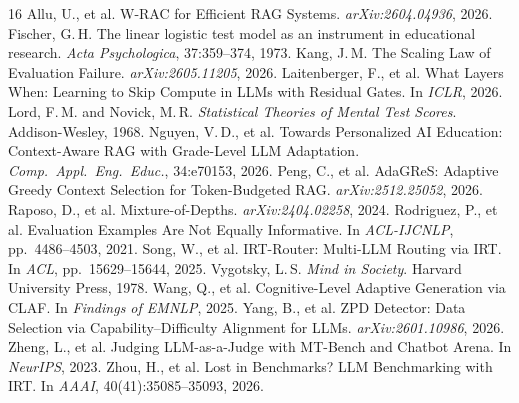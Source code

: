 \documentclass[11pt]{article}
\begin{document}

\begin{thebibliography}{16}
 Allu, U., et al. W-RAC for Efficient RAG Systems. \emph{arXiv:2604.04936}, 2026.
 Fischer, G.\,H. The linear logistic test model as an instrument in educational research. \emph{Acta Psychologica}, 37:359--374, 1973.
 Kang, J.\,M. The Scaling Law of Evaluation Failure. \emph{arXiv:2605.11205}, 2026.
 Laitenberger, F., et al. What Layers When: Learning to Skip Compute in LLMs with Residual Gates. In \emph{ICLR}, 2026.
 Lord, F.\,M. and Novick, M.\,R. \emph{Statistical Theories of Mental Test Scores}. Addison-Wesley, 1968.
 Nguyen, V.\,D., et al. Towards Personalized AI Education: Context-Aware RAG with Grade-Level LLM Adaptation. \emph{Comp.\ Appl.\ Eng.\ Educ.}, 34:e70153, 2026.
 Peng, C., et al. AdaGReS: Adaptive Greedy Context Selection for Token-Budgeted RAG. \emph{arXiv:2512.25052}, 2026.
 Raposo, D., et al. Mixture-of-Depths. \emph{arXiv:2404.02258}, 2024.
 Rodriguez, P., et al. Evaluation Examples Are Not Equally Informative. In \emph{ACL-IJCNLP}, pp.~4486--4503, 2021.
 Song, W., et al. IRT-Router: Multi-LLM Routing via IRT. In \emph{ACL}, pp.~15629--15644, 2025.
 Vygotsky, L.\,S. \emph{Mind in Society}. Harvard University Press, 1978.
 Wang, Q., et al. Cognitive-Level Adaptive Generation via CLAF. In \emph{Findings of EMNLP}, 2025.
 Yang, B., et al. ZPD Detector: Data Selection via Capability--Difficulty Alignment for LLMs. \emph{arXiv:2601.10986}, 2026.
 Zheng, L., et al. Judging LLM-as-a-Judge with MT-Bench and Chatbot Arena. In \emph{NeurIPS}, 2023.
 Zhou, H., et al. Lost in Benchmarks? LLM Benchmarking with IRT. In \emph{AAAI}, 40(41):35085--35093, 2026.
\end{thebibliography}
\end{document}
